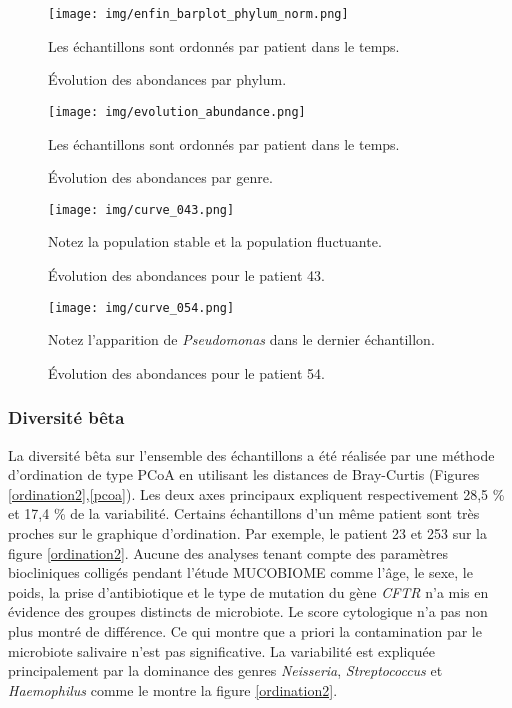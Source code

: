 \documentclass[12pt,a4paper]{article}
\begin{document}
\begin{figure}[H]
\begin{center}
\texttt{[image: img/enfin\_barplot\_phylum\_norm.png]}\hfill
\caption{Évolution des abondances par phylum.} Les échantillons sont ordonnés par patient dans le temps.
\label{plotabundancephylum}
\end{center}
\end{figure}


\begin{figure}[H]
\begin{center}
\texttt{[image: img/evolution\_abundance.png]}\hfill
\caption{Évolution des abondances par genre.}
Les échantillons sont ordonnés par patient dans le temps.
\label{plotabundancecurve}

\end{center}

\end{figure}





\begin{figure}[H]
\begin{center}
\texttt{[image: img/curve\_043.png]}\hfill
\caption{Évolution des abondances pour le patient 43.}
Notez la population stable et la population fluctuante.
\label{evolution43}
\end{center}

\end{figure}

\begin{figure}[H]
\begin{center}
\texttt{[image: img/curve\_054.png]}\hfill
\caption{Évolution des abondances pour le patient 54.}
Notez l'apparition de \textit{Pseudomonas} dans le dernier échantillon.
\label{evolution54}
\end{center}

\end{figure}

\subsubsection{Diversité bêta}
La diversité bêta sur l’ensemble des échantillons a été réalisée par une méthode d’ordination de type PCoA en utilisant les distances de Bray-Curtis (Figures \ref{ordination2},\ref{pcoa}).
Les deux axes principaux expliquent respectivement 28,5 \% et 17,4 \% de la variabilité.
Certains échantillons d’un même patient sont très proches sur le graphique d’ordination. Par exemple, le patient 23 et 253 sur la figure \ref{ordination2}.
Aucune des analyses tenant compte des paramètres biocliniques colligés pendant l'étude MUCOBIOME comme l'âge, le sexe, le poids, la prise d'antibiotique et le type de mutation du gène \textit{CFTR} n’a mis en évidence des groupes distincts de microbiote. Le score cytologique n'a pas non plus montré de différence. Ce qui montre que a priori la contamination par le microbiote salivaire n'est pas significative.
La variabilité est expliquée principalement par la dominance des genres \textit{Neisseria}, \textit{Streptococcus} et \textit{Haemophilus} comme le montre la figure \ref{ordination2}.
\end{document}
